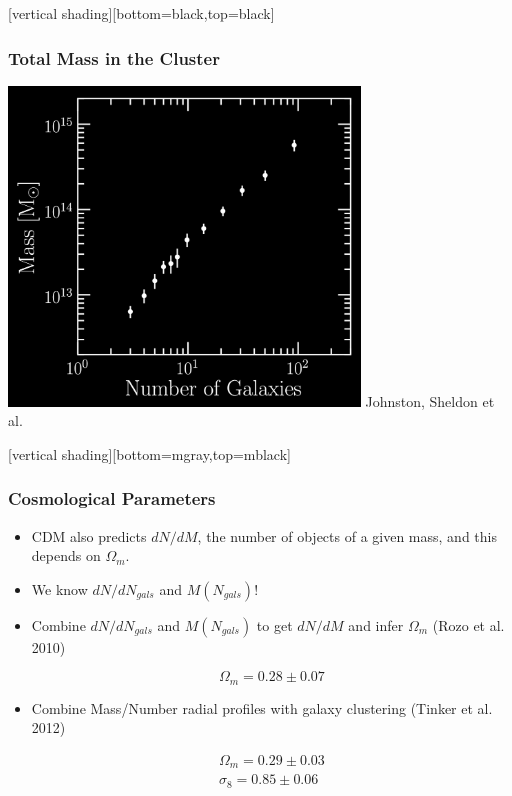 \documentclass{beamer}
\begin{document}
{
    [vertical shading][bottom=black,top=black]


    \frame
    {
        \frametitle{Total Mass in the Cluster}

        \begin{center}
            \includegraphics[width=0.7\textwidth]{mass-rich-plot-icolors.png}
            \newline
            \hfill {\color{gold} Johnston, Sheldon et al.}
        \end{center}
    }
    [vertical shading][bottom=mgray,top=mblack]
}

\frame
{
    \frametitle{Cosmological Parameters}
    \begin{itemize}

        \item CDM also predicts $dN/dM$, the number of objects of a given mass, and
            this depends on {\color{gold} $\Omega_m$}.

        \item We know $dN/dN_{gals}$ and $M(N_{gals})$!

        \item Combine  $dN/dN_{gals}$ and $M(N_{gals})$ to get $dN/dM$ and infer
            $\Omega_m$
            (Rozo et al. 2010)

            {\color{gold}
                \begin{equation}
                    \Omega_m = 0.28 \pm 0.07 \nonumber
                \end{equation}
            }

        \item Combine Mass/Number radial profiles with galaxy clustering 
            (Tinker et al. 2012)

            {\color{gold}
                \begin{eqnarray}
                    \Omega_m = 0.29 \pm 0.03 \nonumber \\
                    \sigma_8 = 0.85 \pm 0.06 \nonumber
                \end{eqnarray}
            }


    \end{itemize}
}
\end{document}

